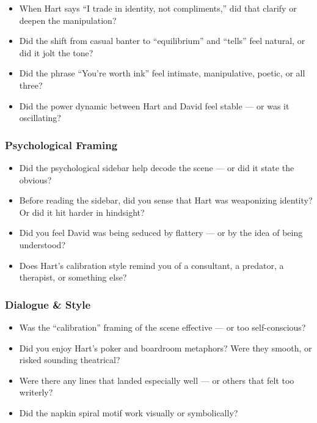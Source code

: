 \begin{itemize}
    \item When Hart says “I trade in identity, not compliments,” did that clarify or deepen the manipulation?
    \item Did the shift from casual banter to “equilibrium” and “tells” feel natural, or did it jolt the tone?
    \item Did the phrase “You’re worth ink” feel intimate, manipulative, poetic, or all three?
    \item Did the power dynamic between Hart and David feel stable — or was it oscillating?
\end{itemize}

\subsubsection{Psychological Framing}

\begin{itemize}
    \item Did the psychological sidebar help decode the scene — or did it state the obvious?
    \item Before reading the sidebar, did you sense that Hart was weaponizing identity? Or did it hit harder in hindsight?
    \item Did you feel David was being seduced by flattery — or by the idea of being understood?
    \item Does Hart’s calibration style remind you of a consultant, a predator, a therapist, or something else?
\end{itemize}

\subsubsection{Dialogue \& Style}

\begin{itemize}
    \item Was the “calibration” framing of the scene effective — or too self-conscious?
    \item Did you enjoy Hart’s poker and boardroom metaphors? Were they smooth, or risked sounding theatrical?
    \item Were there any lines that landed especially well — or others that felt too writerly?
    \item Did the napkin spiral motif work visually or symbolically?
\end{itemize}

